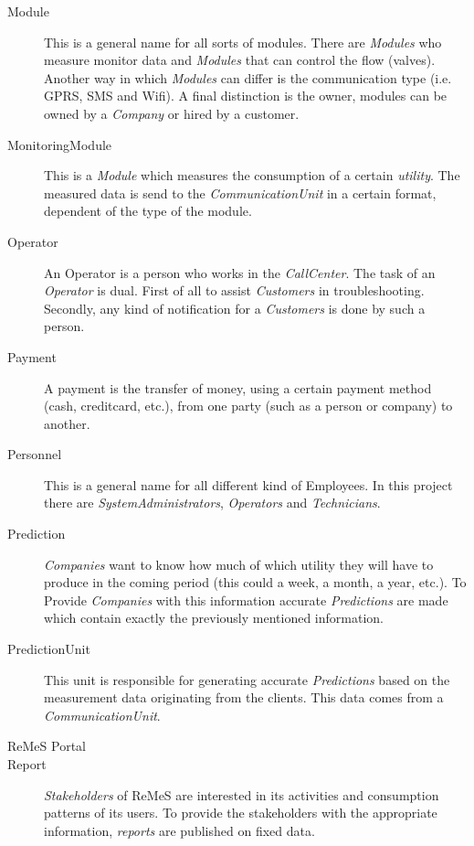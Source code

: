 \begin{description}
\item[Module] This is a general name for all sorts of modules.
There are \emph{Modules} who measure monitor data and \emph{Modules} that can
control the flow (valves). Another way in which \emph{Modules} can differ is the
communication type (i.e. GPRS, SMS and Wifi). A final distinction is the owner,
modules can be owned by a \emph{Company} or hired by a customer.

\item[MonitoringModule] This is a \emph{Module} which measures the consumption
of a certain \emph{utility}. The measured data is send to the
\emph{CommunicationUnit} in a certain format, dependent of the type of the
module.

\item[Operator] An Operator is a person who works in the \emph{CallCenter}. The
task of an \emph{Operator} is dual. First of all to assist \emph{Customers} in
troubleshooting. Secondly, any kind of notification for a \emph{Customers} is
done by such a person.

\item[Payment] A payment is the transfer of money, using a certain payment
method (cash, creditcard, etc.), from one party (such as a person or company) to
another.

\item[Personnel] This is a general name for all different kind of Employees. In
this project there are \emph{SystemAdministrators}, \emph{Operators} and
\emph{Technicians}.

\item[Prediction] \emph{Companies} want to know how much of which utility they
will have to produce in the coming period (this could a week, a month, a year,
etc.). To Provide \emph{Companies} with this information accurate
\emph{Predictions} are made which contain exactly the previously mentioned
information.

\item[PredictionUnit] This unit is responsible for generating accurate
\emph{Predictions} based on the measurement data originating from the clients.
This data comes from a \emph{CommunicationUnit}.

\item[ReMeS Portal] %

\item[Report] \emph{Stakeholders} of ReMeS are interested in its activities and
consumption patterns of its users. To provide the stakeholders with the
appropriate information, \emph{reports} are published on fixed data.


\end{description}
